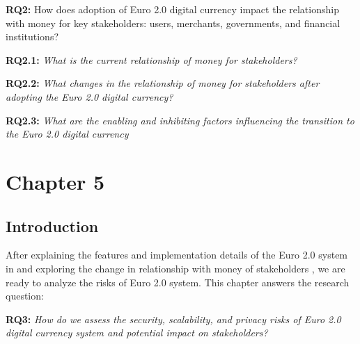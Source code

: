 \documentclass[12pt]{article} %
\newcommand{\hypernameref}[1]{\hyperref[#1]{\nameref{#1}}}
\begin{document}
{{

\begin{quoting}
	\textbf{RQ2:} How does adoption of Euro 2.0 digital currency impact the relationship with money for key stakeholders: users, merchants, governments, and financial institutions?
\end{quoting}

\begin{quoting}
	\textbf{RQ2.1: }\textit{What is the current relationship of money for stakeholders?}
\end{quoting}
\begin{quoting}
	\textbf{RQ2.2: }\textit{What changes in the relationship of money for stakeholders after adopting the Euro 2.0 digital currency?}
\end{quoting}
\begin{quoting}
	\textbf{RQ2.3: }\textit{What are the enabling and inhibiting factors influencing the transition to the Euro 2.0 digital currency}
\end{quoting}

\pagebreak

\section{Chapter 5} \label{sec:5}

\subsection{Introduction} \label{ssec:5:intro}

After explaining the features and implementation details of the Euro 2.0 system in \hypernameref{sec:3} and exploring the change in relationship with money of stakeholders \hypernameref{sec:4}, we are ready to analyze the risks of Euro 2.0 system. This chapter answers the research question:

\begin{quoting}
	\textbf{RQ3:} \textit{How do we assess the security, scalability, and privacy risks of Euro 2.0 digital currency system and potential impact on stakeholders?}
\end{quoting}

}}
\end{document}
